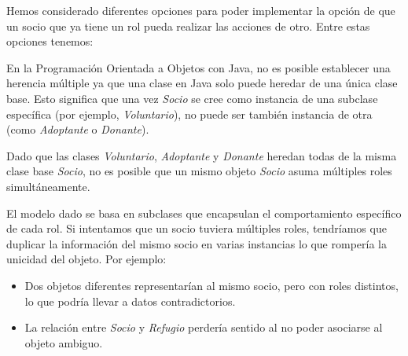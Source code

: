 
Hemos considerado diferentes opciones para poder implementar la opción de que un socio que ya tiene un rol
pueda realizar las acciones de otro. Entre estas opciones tenemos:

En la Programación Orientada a Objetos con Java, no es posible establecer 
una herencia múltiple ya que una clase en Java solo puede heredar de una 
única clase base. Esto significa que una vez \emph{Socio} se cree como 
instancia de una subclase específica (por ejemplo, \emph{Voluntario}), 
no puede ser también instancia de otra (como \emph{Adoptante} o \emph{Donante}).\par
\vspace{0.15cm}
Dado que las clases \emph{Voluntario}, \emph{Adoptante} y \emph{Donante} 
heredan todas de la misma clase base \emph{Socio}, no es posible que un 
mismo objeto \emph{Socio} asuma múltiples roles simultáneamente.\par

El modelo dado se basa en subclases que encapsulan el comportamiento 
específico de cada rol. Si intentamos que un socio tuviera múltiples roles, 
tendríamos que duplicar la información del mismo socio en varias instancias 
lo que rompería la unicidad del objeto. Por ejemplo:
\begin{itemize}
    \item Dos objetos diferentes representarían al mismo socio, pero 
    con roles distintos, lo que podría llevar a datos contradictorios.
    \item La relación entre \emph{Socio} y \emph{Refugio} perdería sentido 
    al no poder asociarse al objeto ambiguo.
\end{itemize}

\newpage